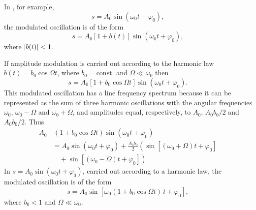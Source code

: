 In , for example,  
\begin{equation*}%
s = A_{0}\sin (\omega_{0}t + \varphi_{0}), 
\end{equation*}
the modulated oscillation is of the form
\begin{equation*}%
s = A_{0} [1 + b(t)]\sin (\omega_{0}t + \varphi_{0}), 
\end{equation*}
where $\abs{b(t)}< 1$.

If amplitude modulation is carried out according to the harmonic
law $b(t)= b_{0} \cos \Omega t$, where $b_{0} = \text{const.}$ and $\Omega \ll \omega_{0}$ then
\begin{equation*}%
s = A_{0} [1 + b_{0}\cos \Omega t ]\sin (\omega_{0}t + \varphi_{0}).
\end{equation*}
This modulated oscillation has a line frequency spectrum because it can be represented as the sum of three harmonic oscillations with the angular frequencies $\omega_{0}$, $\omega_{0} - \Omega$ and $\omega_{0} + \Omega$, and amplitudes equal, respectively, to $A_{0}$, $A_{0}b_{0}/2$ and $A_{0}b_{0}/2$. Thus
\begin{align*}
A_{0} & \, (1 + b_{0} \cos \Omega t) \sin (\omega_{0} t + \varphi_{0}) \\
& = A_{0} \sin (\omega_{0} t + \varphi_{0}) + \frac{A_{0} b_{0}}{2} \left( \sin[(\omega_{0} + \Omega) t + \varphi_{0}] \right. \\
& \quad + \left. \sin[(\omega_{0} - \Omega) t + \varphi_{0}] \right)
\end{align*}
In  $s = A_{0} \sin (\omega_{0}t + \varphi_{0})$, carried out according to a harmonic law, the modulated oscillation is of the form 
\begin{equation*}%
s = A_{0} \sin [\omega_{0} (1+ b_{0}\cos \Omega t) \, t+ \varphi_{0}],
\end{equation*}
where $b_{0} < 1$ and $\Omega \ll \omega_{0}$.

